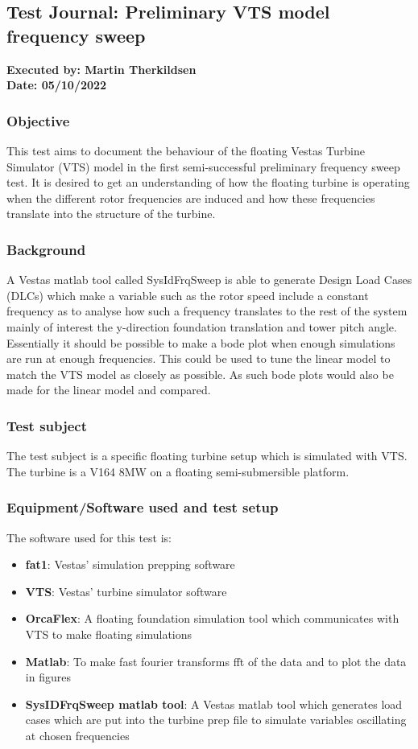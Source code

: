 \subsection{Test Journal: Preliminary VTS model frequency sweep} \label{app:tj_00}

\textbf{Executed by: Martin Therkildsen} \\
\textbf{Date: 05/10/2022}

\subsubsection{Objective}
This test aims to document the behaviour of the floating Vestas Turbine Simulator (VTS) model in the first semi-successful preliminary frequency sweep test. It is desired to get an understanding of how the floating turbine is operating when the different rotor frequencies are induced and how these frequencies translate into the structure of the turbine.

\subsubsection{Background}
A Vestas matlab tool called SysIdFrqSweep is able to generate Design Load Cases (DLCs) which make a variable such as the rotor speed include a constant frequency as to analyse how such a frequency translates to the rest of the system mainly of interest the y-direction foundation translation and tower pitch angle. Essentially it should be possible to make a bode plot when enough simulations are run at enough frequencies. This could be used to tune the linear model to match the VTS model as closely as possible. As such bode plots would also be made for the linear model and compared.

\subsubsection{Test subject}
The test subject is a specific floating turbine setup which is simulated with VTS. The turbine is a V164 8MW on a floating semi-submersible platform.

\subsubsection{Equipment/Software used and test setup}
The software used for this test is:
\begin{itemize}
	\item \textbf{fat1}: Vestas' simulation prepping software
	\item \textbf{VTS}: Vestas' turbine simulator software
	\item \textbf{OrcaFlex}: A floating foundation simulation tool which communicates with VTS to make floating simulations
	\item \textbf{Matlab}: To make fast fourier transforms fft of the data and to plot the data in figures
	\item \textbf{SysIDFrqSweep matlab tool}: A Vestas matlab tool which generates load cases which are put into the turbine prep file to simulate variables oscillating at chosen frequencies
\end{itemize}


